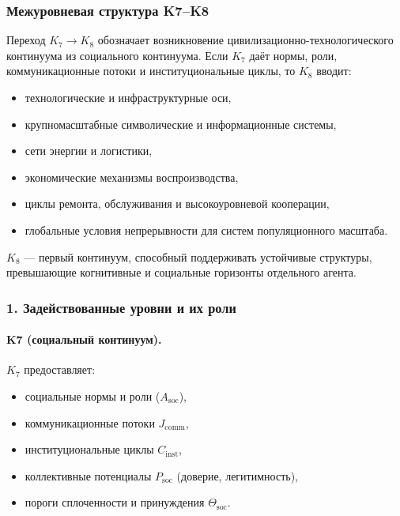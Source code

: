 
\subsubsection{Межуровневая структура K7–K8}
\label{sec:crossk-k7-k8}

Переход $K_7 \rightarrow K_8$ обозначает возникновение
цивилизационно-технологического континуума из социального континуума.
Если $K_7$ даёт нормы, роли, коммуникационные потоки и институциональные
циклы, то $K_8$ вводит:
\begin{itemize}
  \item технологические и инфраструктурные оси,
  \item крупномасштабные символические и информационные системы,
  \item сети энергии и логистики,
  \item экономические механизмы воспроизводства,
  \item циклы ремонта, обслуживания и высокоуровневой кооперации,
  \item глобальные условия непрерывности для систем популяционного масштаба.
\end{itemize}

$K_8$ — первый континуум, способный поддерживать устойчивые структуры,
превышающие когнитивные и социальные горизонты отдельного агента.

\subsubsection{1. Задействованные уровни и их роли}

\paragraph{K7 (социальный континуум).}
$K_7$ предоставляет:
\begin{itemize}
  \item социальные нормы и роли ($A_{\mathrm{soc}}$),
  \item коммуникационные потоки $J_{\mathrm{comm}}$,
  \item институциональные циклы $C_{\mathrm{inst}}$,
  \item коллективные потенциалы $P_{\mathrm{soc}}$ (доверие, легитимность),
  \item пороги сплоченности и принуждения $\Theta_{\mathrm{soc}}$.
\end{itemize}

